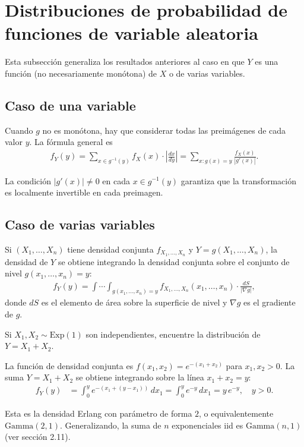\section{Distribuciones de probabilidad de funciones de variable aleatoria}

Esta subsecci\'on generaliza los resultados anteriores al caso en que $Y$ es una
funci\'on (no necesariamente mon\'otona) de $X$ o de varias variables.

\subsection{Caso de una variable}

Cuando $g$ no es mon\'otona, hay que considerar todas las preim\'agenes de cada
valor $y$. La f\'ormula general es
\begin{align}
 \label{eq:3.2.5}
 f_Y(y) = \sum_{x \in g^{-1}(y)} f_X(x) \cdot \left|\frac{dx}{dy}\right|
 = \sum_{x: g(x) = y} \frac{f_X(x)}{|g'(x)|}.
\end{align}

\begin{observacion}
La condici\'on $|g'(x)| \neq 0$ en cada $x \in g^{-1}(y)$ garantiza que la
transformaci\'on es localmente invertible en cada preimagen.
\end{observacion}

\subsection{Caso de varias variables}

Si $(X_1, \ldots, X_n)$ tiene densidad conjunta $f_{X_1, \ldots, X_n}$ y
$Y = g(X_1, \ldots, X_n)$, la densidad de $Y$ se obtiene integrando la densidad
conjunta sobre el conjunto de nivel $g(x_1, \ldots, x_n) = y$:
\begin{align}
 \label{eq:3.2.6}
 f_Y(y) = \int \cdots \int_{g(x_1, \ldots, x_n) = y} f_{X_1, \ldots, X_n}(x_1, \ldots, x_n)
 	\cdot \frac{dS}{|\nabla g|},
\end{align}
donde $dS$ es el elemento de \'area sobre la superficie de nivel y $\nabla g$ es
el gradiente de $g$.

\begin{ejemplo}
 \label{exmp:3.2.5}
Si $X_1, X_2 \sim \text{Exp}(1)$ son independientes, encuentre la distribuci\'on de
$Y = X_1 + X_2$.
\end{ejemplo}

\begin{solucion}
La funci\'on de densidad conjunta es $f(x_1, x_2) = e^{-(x_1+x_2)}$ para
$x_1, x_2 > 0$. La suma $Y = X_1 + X_2$ se obtiene integrando sobre la l\'inea
$x_1 + x_2 = y$:
\begin{align}
 f_Y(y) &= \int_0^y e^{-(x_1 + (y-x_1))}\,dx_1 = \int_0^y e^{-y}\,dx_1 = y\,e^{-y}, \quad y > 0.
\end{align}

Esta es la densidad Erlang con par\'ametro de forma $2$, o equivalentemente
$\text{Gamma}(2, 1)$. Generalizando, la suma de $n$ exponenciales iid es
$\text{Gamma}(n, 1)$ (ver secci\'on 2.11).
\end{solucion}


